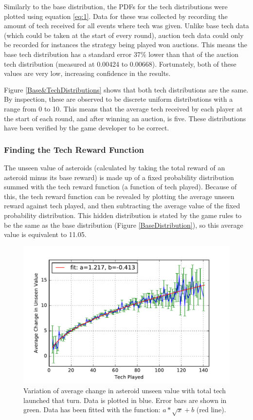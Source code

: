 \documentclass[11pt, twoside]{article}
\begin{document}
Similarly to the base distribution, the PDFs for the tech distributions were plotted using equation \ref{eq:1}. Data for these was collected by recording the amount of tech received for all events where tech was given. Unlike base tech data (which could be taken at the start of every round), auction tech data could only be recorded for instances the strategy being played won auctions. This means the base tech distribution has a standard error 37\% lower than that of the auction tech distribution (measured at 0.00424 to 0.00668). Fortunately, both of these values are very low, increasing confidence in the results. 

Figure \ref{Base&TechDistributions} shows that both tech distributions are the same. By inspection, these are observed to be discrete uniform distributions with a range from 0 to 10. This means that the average tech received by each player at the start of each round, and after winning an auction, is five. These distributions have been verified by the game developer to be correct.

\subsubsection*{Finding the Tech Reward Function}
The unseen value of asteroids (calculated by taking the total reward of an asteroid minus its base reward) is made up of a fixed probability distribution summed with the tech reward function (a function of tech played). Because of this, the tech reward function can be revealed by plotting the average unseen reward against tech played, and then subtracting the average value of the fixed probability distribution. This hidden distribution is stated by the game rules to be the same as the base distribution (Figure \ref{BaseDistribution}), so this average value is equivalent to 11.05.

\begin{figure}[b!]
	\centering
	\includegraphics[width=\textwidth,keepaspectratio]{tech_function.pdf}
	\caption{Variation of average change in asteroid unseen value with total tech launched that turn. Data is plotted in blue. Error bars are shown in green. Data has been fitted with the function: $a*\sqrt{x}+b$ (red line).}
	\label{TechFunction}
\end{figure}
\end{document}
